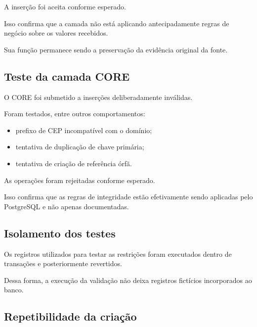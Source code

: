 \documentclass[12pt,a4paper]{article}
\begin{document}
{	A inserção foi aceita conforme esperado.
	
	Isso confirma que a camada não está aplicando antecipadamente regras
	de negócio sobre os valores recebidos.
	
	Sua função permanece sendo a preservação da evidência original da
	fonte.
	
	\subsection{Teste da camada CORE}
	
	O CORE foi submetido a inserções deliberadamente inválidas.
	
	Foram testados, entre outros comportamentos:
	
	\begin{itemize}[leftmargin=1.2cm]
		
		\item prefixo de CEP incompatível com o domínio;
		
		\item tentativa de duplicação de chave primária;
		
		\item tentativa de criação de referência órfã.
		
	\end{itemize}
	
	As operações foram rejeitadas conforme esperado.
	
	Isso confirma que as regras de integridade estão efetivamente sendo
	aplicadas pelo PostgreSQL e não apenas documentadas.
	
	\subsection{Isolamento dos testes}
	
	Os registros utilizados para testar as restrições foram executados
	dentro de transações e posteriormente revertidos.
	
	Dessa forma, a execução da validação não deixa registros fictícios
	incorporados ao banco.
	
	\subsection{Repetibilidade da criação}
	
}
\end{document}
